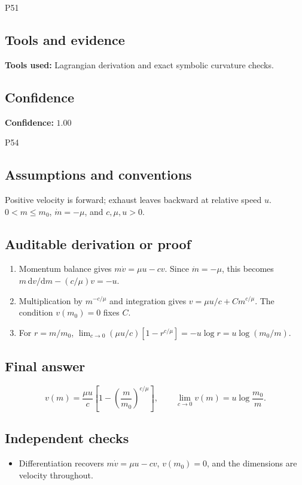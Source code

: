 \documentclass[11pt]{article}
\newcommand{\dd}{\mathrm{d}}
\begin{document}
\begin{mprsolution}{P51}
\subsection*{Tools and evidence}
\textbf{Tools used:} Lagrangian derivation and exact symbolic curvature checks.
\subsection*{Confidence}
\textbf{Confidence:} \(1.00\)
\end{mprsolution}

\begin{mprsolution}{P54}
\subsection*{Assumptions and conventions}
Positive velocity is forward; exhaust leaves backward at relative speed \(u\).
\(0<m\le m_0\), \(\dot m=-\mu\), and \(c,\mu,u>0\).
\subsection*{Auditable derivation or proof}
\begin{enumerate}[label=\textbf{Step \arabic*:},leftmargin=*]
\item Momentum balance gives \(m\dot v=\mu u-cv\).
Since \(\dot m=-\mu\), this becomes
\(m\,\dd v/\dd m-(c/\mu)v=-u\).
\item Multiplication by \(m^{-c/\mu}\) and integration gives
\(v=\mu u/c+C m^{c/\mu}\).  The condition \(v(m_0)=0\) fixes \(C\).
\item For \(r=m/m_0\),
\(\lim_{c\to0}(\mu u/c)[1-r^{c/\mu}]
=-u\log r=u\log(m_0/m)\).
\end{enumerate}
\subsection*{Final answer}
\[
\boxed{\displaystyle
v(m)=\frac{\mu u}{c}\left[1-\left(\frac{m}{m_0}\right)^{c/\mu}\right],
\qquad
\lim_{c\to0}v(m)=u\log\frac{m_0}{m}.}
\]
\subsection*{Independent checks}
\begin{itemize}[leftmargin=*]
\item Differentiation recovers \(m\dot v=\mu u-cv\), \(v(m_0)=0\), and
the dimensions are velocity throughout.
\end{itemize}

\end{mprsolution}
\end{document}
